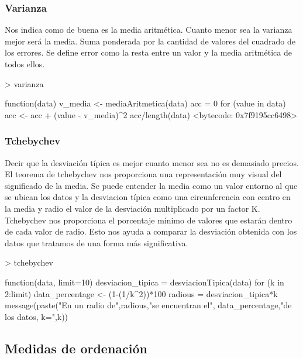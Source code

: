 \documentclass [a4paper] {article}
\begin{document}
\subsubsection{Varianza}
Nos indica como de buena es la media aritmética. Cuanto menor sea la varianza mejor será la media.
Suma ponderada por la cantidad de valores del cuadrado de los errores.
Se define error como la resta entre un valor y la media aritmética de todos ellos.
\begin{Schunk}
\begin{Sinput}
> varianza
\end{Sinput}
\begin{Soutput}
function(data){
  v_media <- mediaAritmetica(data)
  acc = 0
  for (value in data){
    acc <- acc + (value - v_media)^2
  }
  acc/length(data)
}
<bytecode: 0x7f9195cc6498>
\end{Soutput}
\end{Schunk}
\subsubsection{Tchebychev}
Decir que la desviación típica es mejor cuanto menor sea no es demasiado precios.
El teorema de tchebychev nos proporciona una representación muy visual del significado de la media.
Se puede entender la media como un valor entorno al que se ubican los datos y la desviacion típica como una circunferencia con centro en la media y radio el valor de la desviación multiplicado por un factor K.
Tchebychev nos proporciona el porcentaje mínimo de valores que estarán dentro de cada valor de radio.
Esto nos ayuda a comparar la desviación obtenida con los datos que tratamos de una forma más significativa.
\begin{Schunk}
\begin{Sinput}
> tchebychev
\end{Sinput}
\begin{Soutput}
function(data, limit=10){
  desviacion_tipica = desviacionTipica(data)
  for (k in 2:limit){
    data_percentage <- (1-(1/k^2))*100
    radious = desviacion_tipica*k
    message(paste("En un radio de",radious,"se encuentran el",
                  data_percentage,"de los datos, k=",k))
  }
}
\end{Soutput}
\end{Schunk}

\newpage
\subsection{Medidas de ordenación}
\end{document}
